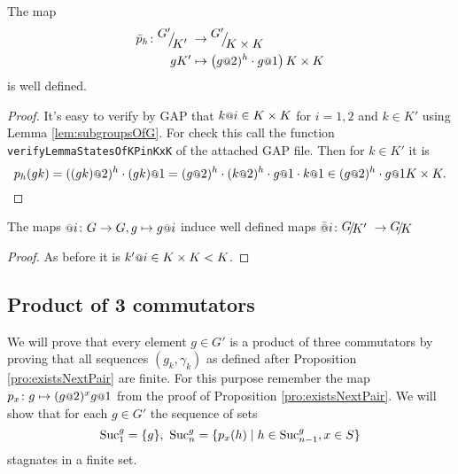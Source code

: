 \documentclass[a4paper,11pt]{amsart}
\begin{document}
\begin{lem} \label{lem:pIsDefinedModK'}
 The map 
 \begin{align*} 
  \bar p_h\colon \RNK{G'}{K'} &\to \RNK{G'}{K\times K}\\
  gK'&\mapsto \left(g\at{2})^h\cdot g\at{1}\right){K\times K}
 \end{align*}
is well defined.
\end{lem}
\begin{proof}
 It's easy to verify by GAP that $k\at{i} \in K\times K$ for $i=1,2$ and $k\in K'$ using Lemma \ref{lem:subgroupsOfG}.
 For check this call the function \lstinline{verifyLemmaStatesOfKPinKxK} of the attached GAP file.
 Then for $k\in K'$ it is 
 \[p_h(gk) = ((gk)\at{2})^h\cdot (gk)\at{1} = (g\at{2})^h\cdot (k\at{2})^h\cdot g\at{1}\cdot k\at{1}\in (g\at{2})^h\cdot g\at{1}K\times K.\]
\end{proof}
\begin{lem} \label{lem:atIsWellDefinedModK'}
 The maps $\at{i}\colon G\to G, g\mapsto g\at{i}$ induce well defined maps $\att{i}\colon \RNK{G}{K'}\to\RNK{G}{K}$
\end{lem}
\begin{proof}
 As before it is $k'\at{i} \in K\times K < K$.
%  
%  
% 
\end{proof}
\subsection{Product of 3 commutators}
We will prove that every element $g\in G'$ is a product of three commutators by proving that all
sequences $(g_k,\gamma_k)$ as defined after Proposition \ref{pro:existsNextPair} are finite.
For this purpose remember the map $p_x\colon g \mapsto (g\at{2})^x g\at{1}$ from the proof of Proposition \ref{pro:existsNextPair}.
We will show that for each $g\in G'$ the sequence of sets 
\[\textup{Suc}_1^g=\{g\},\ \textup{Suc}_n^g = \{p_x(h) \mid h\in \textup{Suc}_{n-1}^g, x\in S\} \]
stagnates in a finite set. 
\end{document}
